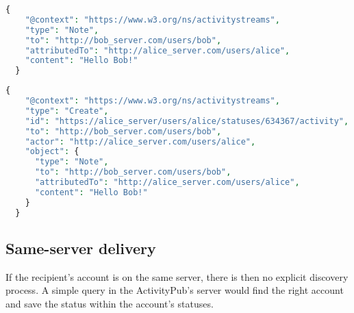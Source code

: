 \lstset{style=JSONStyle}
\begin{lstlisting}[language=PHP, caption=ActivityStreams note object, label=fig:create_note]
  {
    "@context": "https://www.w3.org/ns/activitystreams",
    "type": "Note",
    "to": "http://bob_server.com/users/bob",
    "attributedTo": "http://alice_server.com/users/alice",
    "content": "Hello Bob!"
  }
\end{lstlisting}

\lstset{style=JSONStyle}
\begin{lstlisting}[language=PHP, caption=ActivityStreams create activity, label=fig:create_activity]
  {
    "@context": "https://www.w3.org/ns/activitystreams",
    "type": "Create",
    "id": "https://alice_server/users/alice/statuses/634367/activity",
    "to": "http://bob_server.com/users/bob",
    "actor": "http://alice_server.com/users/alice",
    "object": {
      "type": "Note",
      "to": "http://bob_server.com/users/bob",
      "attributedTo": "http://alice_server.com/users/alice",
      "content": "Hello Bob!"
    }
  }
\end{lstlisting}


\subsection{Same-server delivery}
If the recipient's account is on the same server, there is then no explicit discovery process. A simple query in the ActivityPub's server would find the right account and save the status within the account's statuses. 


